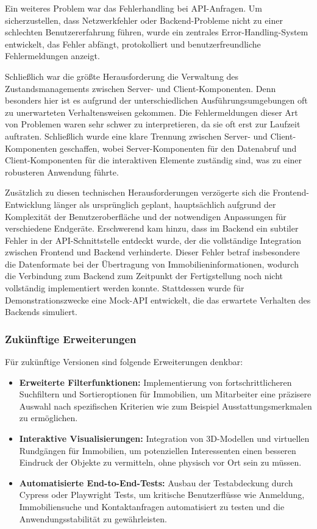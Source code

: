 										Ein weiteres Problem war das Fehlerhandling bei API-Anfragen. Um sicherzustellen, dass Netzwerkfehler oder Backend-Probleme nicht zu einer schlechten Benutzererfahrung führen, wurde ein zentrales Error-Handling-System entwickelt, das Fehler abfängt, protokolliert und benutzerfreundliche Fehlermeldungen anzeigt.
										
										Schließlich war die größte Herausforderung die Verwaltung des Zustandsmanagements zwischen Server- und Client-Komponenten. Denn besonders hier ist es aufgrund der unterschiedlichen Ausführungsumgebungen oft zu unerwarteten Verhaltensweisen gekommen. Die Fehlermeldungen dieser Art von Problemen waren sehr schwer zu interpretieren, da sie oft erst zur Laufzeit auftraten. Schließlich wurde eine klare Trennung zwischen Server- und Client-Komponenten geschaffen, wobei Server-Komponenten für den Datenabruf und Client-Komponenten für die interaktiven Elemente zuständig sind, was zu einer robusteren Anwendung führte.
										
										Zusätzlich zu diesen technischen Herausforderungen verzögerte sich die Frontend-Entwicklung länger als ursprünglich geplant, hauptsächlich aufgrund der Komplexität der Benutzeroberfläche und der notwendigen Anpassungen für verschiedene Endgeräte. Erschwerend kam hinzu, dass im Backend ein subtiler Fehler in der API-Schnittstelle entdeckt wurde, der die vollständige Integration zwischen Frontend und Backend verhinderte. Dieser Fehler betraf insbesondere die Datenformate bei der Übertragung von Immobilieninformationen, wodurch die Verbindung zum Backend zum Zeitpunkt der Fertigstellung noch nicht vollständig implementiert werden konnte. Stattdessen wurde für Demonstrationszwecke eine Mock-API entwickelt, die das erwartete Verhalten des Backends simuliert.
										
										
										\subsubsection{Zukünftige Erweiterungen}
										Für zukünftige Versionen sind folgende Erweiterungen denkbar:
										\begin{itemize}
											\item \textbf{Erweiterte Filterfunktionen:} Implementierung von fortschrittlicheren Suchfiltern und Sortieroptionen für Immobilien, um Mitarbeiter eine präzisere Auswahl nach spezifischen Kriterien wie zum Beispiel Ausstattungsmerkmalen zu ermöglichen.
											
											\item \textbf{Interaktive Visualisierungen:} Integration von 3D-Modellen und virtuellen Rundgängen für Immobilien, um potenziellen Interessenten einen besseren Eindruck der Objekte zu vermitteln, ohne physisch vor Ort sein zu müssen.
											
											\item \textbf{Automatisierte End-to-End-Tests:} Ausbau der Testabdeckung durch Cypress oder Playwright Tests, um kritische Benutzerflüsse wie Anmeldung, Immobiliensuche und Kontaktanfragen automatisiert zu testen und die Anwendungsstabilität zu gewährleisten.
										\end{itemize}